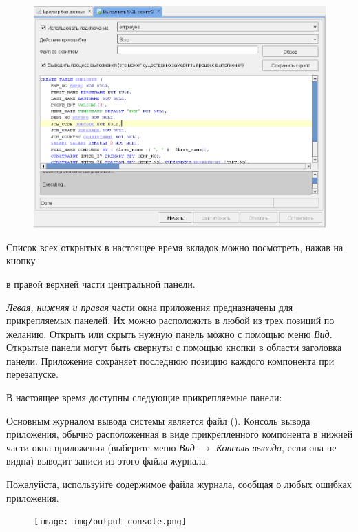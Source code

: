 	\begin{figure}[H]
		\centering
		\includegraphics[width = 0.8\linewidth]{img/execute_script.png}
	\end{figure}

Список всех открытых в настоящее время вкладок можно посмотреть, нажав на кнопку  в правой верхней части центральной панели.


\textit{Левая, нижняя и правая} части окна приложения предназначены для прикрепляемых панелей. Их можно расположить в любой из трех позиций по желанию. Открыть или скрыть нужную панель можно с помощью меню \textit{Вид}. Открытые панели могут быть свернуты с помощью кнопки в области заголовка панели. Приложение сохраняет последнюю позицию каждого компонента при перезапуске.

В настоящее время доступны следующие прикрепляемые панели:


Основным журналом вывода системы является файл  (). Консоль вывода приложения, обычно расположенная в виде прикрепленного компонента в нижней части окна приложения (выберите меню \textit{Вид} $\rightarrow$ \textit{Консоль вывода}, если она не видна) выводит записи из этого файла журнала.

\begin{redremark}
Пожалуйста, используйте содержимое файла журнала, сообщая о любых ошибках приложения.
\end{redremark}

\begin{figure}[H]
	\centering
	\texttt{[image: img/output\_console.png]}
\end{figure}


